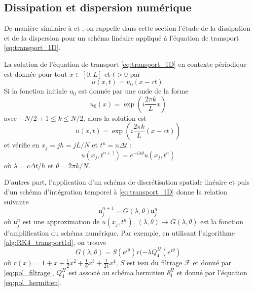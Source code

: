 \subsection{Dissipation et dispersion numérique}

De manière similaire à \cite{Desquesnes2007} et \cite{Dubois2016}, on rappelle dans cette section l'étude de la dissipation et de la dispersion pour un schéma linéaire appliqué à l'équation de transport \eqref{eq:transport_1D}.

La solution de l'équation de transport \eqref{eq:transport_1D} en contexte périodique est donnée pour tout $x \in [0,L]$ et $t>0$ par
\begin{equation}
u(x,t)=u_0(x-ct).
\end{equation}
Si la fonction initiale $u_0$ est donnée par une onde de la forme 
\begin{equation}
u_0(x) = \exp \left( i \dfrac{2 \pi k}{L} x \right)
\end{equation}
avec $-N/2 +1 \leq k \leq N/2 $, alors la solution est
\begin{equation}
u(x,t) = \exp \left( i \dfrac{2 \pi k}{L} (x-ct) \right)
\end{equation}
et vérifie en $x_j = j h = j L/N$ et $t^n = n \Delta t$ :
\begin{equation}
u(x_j,t^{n+1}) = e^{-i \lambda \theta} u(x_j, t^n)
\label{eq:e(ilambdateta)}
\end{equation}
où $\lambda = c \Delta t /h$ et $\theta = 2 \pi k / N$.

D'autres part, l'application d'un schéma de discrétisation spatiale linéaire et puis d'un schéma d'intégration temporel à \eqref{eq:transport_1D} donne la relation suivante 
\begin{equation}
\mathfrak{u}_j^{n+1} = G(\lambda, \theta) \mathfrak{u}_j^n
\end{equation}
où $\mathfrak{u}_j^n$ est une approximation de $u(x_j, t^n)$.
$(\lambda,\theta)\mapsto G(\lambda,\theta)$ est la fonction d'amplification du schéma numérique.
Par exemple, en utilisant l'algorithme \ref{alg:RK4_transport1d}, on trouve
\begin{equation}
G(\lambda, \theta) = S(e^{i \theta}) r(- \lambda Q^H_{4}(e^{i \theta})
\end{equation}
où $r(x) =  1 + x + \frac{1}{2}x^2 + \frac{1}{6}x^3 + \frac{1}{24}x^4$, $S$ est issu du filtrage $\mathcal{F}$ et donné par \eqref{eq:pol_filtrage}, $Q_4^H$ est associé au schéma hermitien $\delta_4^H$ et donné par l'équation \eqref{eq:pol_hermitien}.

